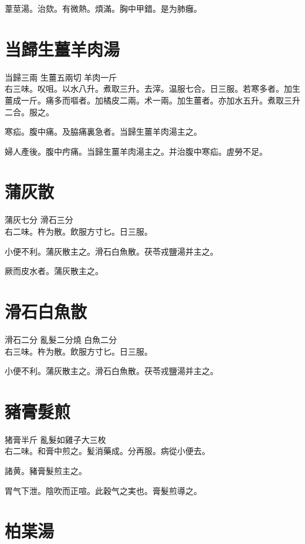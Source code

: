 葦莖湯。治欬。有微熱。煩滿。胸中甲錯。是为肺癰。

\section{当歸生薑羊肉湯}

当歸{\scriptsize 三兩} 生薑{\scriptsize 五兩切} 羊肉{\scriptsize 一斤}\\
右三味。㕮咀。以水八升。煮取三升。去滓。温服七合。日三服。若寒多者。加生薑成一斤。痛多而嘔者。加橘皮二兩。术一兩。加生薑者。亦加水五升。煮取三升二合。服之。

寒疝。腹中痛。及脇痛裏急者。当歸生薑羊肉湯主之。

{\khaaitp 婦人}產後。腹中㽲痛。当歸生薑羊肉湯主之。并治腹中寒疝。虗勞不足。

\section{蒲灰散}

蒲灰{\scriptsize 七分} 滑石{\scriptsize 三分}\\
右二味。杵为散。飲服方寸匕。日三服。

小便不利。蒲灰散主之。滑石白魚散。茯苓戎鹽湯并主之。

厥而皮水者。蒲灰散主之。

\section{滑石白魚散}

滑石{\scriptsize 二分} 亂髮{\scriptsize 二分燒} 白魚{\scriptsize 二分}\\
右三味。杵为散。飲服方寸匕。日三服。

小便不利。蒲灰散主之。滑石白魚散。茯苓戎鹽湯并主之。

\section{豬膏髮煎}

猪膏{\scriptsize 半斤} 亂髮{\scriptsize 如雞子大三枚}\\
右二味。和膏中煎之。髪消藥成。分再服。病從小便去。

諸黄。豬膏髮煎主之。

胃气下泄。陰吹而正喧。此穀气之実也。膏髮煎導之。

\section{柏枼湯}

